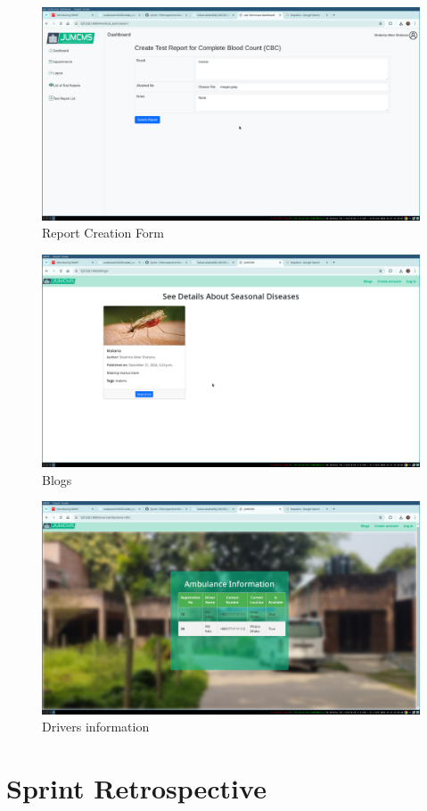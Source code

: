 \documentclass[a4paper,12pt]{article}
\begin{document}
\begin{figure}[H]
    \centering
    \includegraphics[width=1\textwidth]{images/sprintoutput07.png}
    \caption{Report Creation Form}
    \label{fig:reportform}
\end{figure}

\begin{figure}[H]
    \centering
    \includegraphics[width=1\textwidth]{images/sprintoutput08.png}
    \caption{Blogs}
    \label{fig:blogs}
\end{figure}

\begin{figure}[H]
    \centering
    \includegraphics[width=1\textwidth]{images/sprintoutput09.png}
    \caption{Drivers information}
    \label{fig:driverinformation}
\end{figure}

\newpage
\section{Sprint Retrospective}
\end{document}
